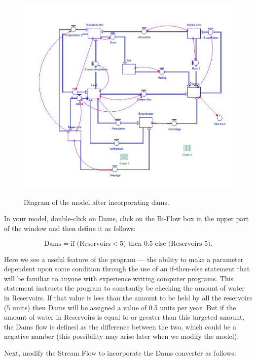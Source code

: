 \documentclass[11pt,letterpaper]{article}
\begin{document}
\begin{figure}[h]
\begin{center}
\includegraphics[]{./dammodel}
\label{fig:dammodel}
\caption{Diagram of the model after incorporating dams.}
\end{center}
\end{figure}

In your model, double-click on Dams, click on the Bi-Flow box in the upper part of the window and then define it as follows:

$$\mbox{Dams} = \mbox{if (Reservoirs}<\mbox{5) then 0.5 else (Reservoirs-5)}.$$

Here we see a useful feature of the program --- the ability to make a parameter dependent upon some condition through the use of an if-then-else statement that will be familiar to anyone with experience writing computer programs. This statement instructs the program to constantly be checking the amount of water in Reservoirs. If that value is less than the amount to be held by all the reservoirs (5 units) then Dams will be assigned a value of 0.5 units per year. But if the amount of water in Reservoirs is equal to or greater than this targeted amount, the Dams flow is defined as the difference between the two, which could be a negative number (this possibility may arise later when we modify the model).

Next, modify the Stream Flow to incorporate the Dams converter as follows: 
\end{document}
